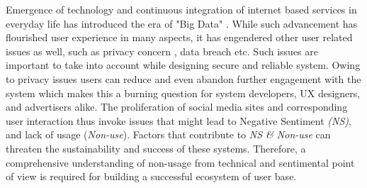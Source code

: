 Emergence of technology and continuous integration of internet based services in everyday life has introduced the era of "Big Data" \cite{lohr2012age}. While such advancement has flourished user experience in many aspects, it has engendered other user related issues as well, such as privacy concern \cite{shin2010effects}, data breach etc. Such issues are important to take into account while designing secure and reliable system. Owing to privacy issues users can reduce and even abandon further engagement with the system \cite{madden2012privacy} which makes this a burning question for system developers, UX designers, and advertisers alike. The proliferation of social media sites and corresponding user interaction thus invoke issues that might lead to Negative Sentiment \emph{(NS)}, and lack of usage (\emph{Non-use}). Factors that contribute to \emph{NS \& Non-use} can threaten the sustainability and success of these systems. Therefore, a comprehensive understanding of non-usage from technical and sentimental point of view is required for building a successful ecosystem of user base.


